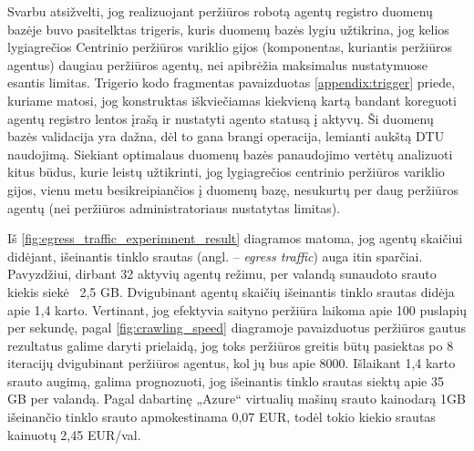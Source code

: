 Svarbu atsižvelti, jog realizuojant peržiūros robotą agentų registro duomenų bazėje buvo pasitelktas trigeris, kuris duomenų bazės lygiu užtikrina, jog kelios lygiagrečios Centrinio peržiūros variklio gijos (komponentas, kuriantis peržiūros agentus) daugiau peržiūros agentų, nei apibrėžia maksimalus nustatymuose esantis limitas. Trigerio kodo fragmentas pavaizduotas \ref{appendix:trigger} priede, kuriame matosi, jog konstruktas iškviečiamas kiekvieną kartą bandant koreguoti agentų registro lentos įrašą ir nustatyti agento statusą į aktyvų. Ši duomenų bazės validacija yra dažna, dėl to gana brangi operacija, lemianti aukštą DTU naudojimą. Siekiant optimalaus duomenų bazės panaudojimo vertėtų analizuoti kitus būdus, kurie leistų užtikrinti, jog lygiagrečios centrinio peržiūros variklio gijos, vienu metu besikreipiančios į duomenų bazę, nesukurtų per daug peržiūros agentų (nei peržiūros administratoriaus nustatytas limitas).

\pagebreak


Iš \ref{fig:egress_traffic_experimnent_result} diagramos matoma, jog agentų skaičiui didėjant, išeinantis tinklo srautas (angl. -- \textit{egress traffic}) auga itin sparčiai. Pavyzdžiui, dirbant 32 aktyvių agentų režimu, per valandą sunaudoto srauto kiekis siekė ~2,5 GB. Dvigubinant agentų skaičių išeinantis tinklo srautas didėja apie 1,4 karto. Vertinant, jog efektyvia saityno peržiūra laikoma apie 100 puslapių per sekundę, pagal \ref{fig:crawling_speed} diagramoje pavaizduotus peržiūros gautus rezultatus galime daryti prielaidą, jog toks peržiūros greitis būtų pasiektas po 8 iteracijų dvigubinant peržiūros agentus, kol jų bus apie 8000. Išlaikant 1,4 karto srauto augimą, galima prognozuoti, jog išeinantis tinklo srautas siektų apie 35 GB per valandą. Pagal dabartinę „Azure“ virtualių mašinų srauto kainodarą 1GB išeinančio tinklo srauto apmokestinama 0,07 EUR, todėl tokio kiekio srautas kainuotų 2,45 EUR/val.


